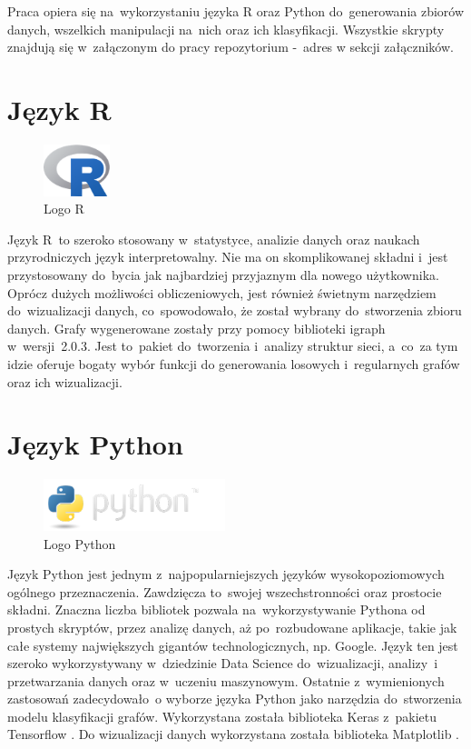 Praca opiera się na~wykorzystaniu języka R \cite{strR} oraz Python \cite{strPython} do~generowania zbiorów danych,
wszelkich manipulacji na~nich oraz ich klasyfikacji.
Wszystkie skrypty znajdują się w~załączonym do pracy repozytorium -~adres w sekcji załączników.

\section{Język R}

\begin{figure}[ht]
	\centering
	\includegraphics[height=1.5cm]{resources/technologies/images/logo_r.png}
	\caption{Logo R \cite{strR}}
	\label{Fig:tech-r}
\end{figure}
\FloatBarrier

Język R~to szeroko stosowany w~statystyce, analizie danych oraz naukach przyrodniczych język interpretowalny.
Nie ma on skomplikowanej składni i~jest przystosowany do~bycia jak najbardziej przyjaznym dla nowego użytkownika.
Oprócz dużych możliwości obliczeniowych, jest również świetnym narzędziem do~wizualizacji danych,
co~spowodowało, że został wybrany do~stworzenia zbioru danych.
Grafy wygenerowane zostały przy pomocy biblioteki igraph \cite{strIgraph} w~wersji~2.0.3.
Jest to~pakiet do~tworzenia i~analizy struktur sieci, a~co~za tym idzie oferuje bogaty wybór funkcji do
generowania losowych i~regularnych grafów oraz ich wizualizacji.

\clearpage

\section{Język Python}

\begin{figure}[ht]
	\centering
	\includegraphics[height=1.5cm]{resources/technologies/images/logo_python.png}
	\caption{Logo Python \cite{strPython}}
	\label{Fig:tech-python}
\end{figure}
\FloatBarrier

Język Python jest jednym z~najpopularniejszych języków wysokopoziomowych ogólnego przeznaczenia.
Zawdzięcza to~swojej wszechstronności oraz prostocie składni.
Znaczna liczba bibliotek pozwala na~wykorzystywanie Pythona od prostych skryptów,
przez analizę danych, aż po~rozbudowane aplikacje, takie jak całe
systemy największych gigantów technologicznych, np. Google. Język ten jest szeroko
wykorzystywany w~dziedzinie Data Science do~wizualizacji, analizy~i przetwarzania danych oraz w~uczeniu maszynowym.
Ostatnie z~wymienionych zastosowań zadecydowało~o wyborze języka Python jako narzędzia do~stworzenia modelu klasyfikacji grafów.
Wykorzystana została biblioteka Keras z~pakietu Tensorflow \cite{strTensorFlow}.
Do wizualizacji danych wykorzystana została biblioteka Matplotlib \cite{strMatplotlib}.

